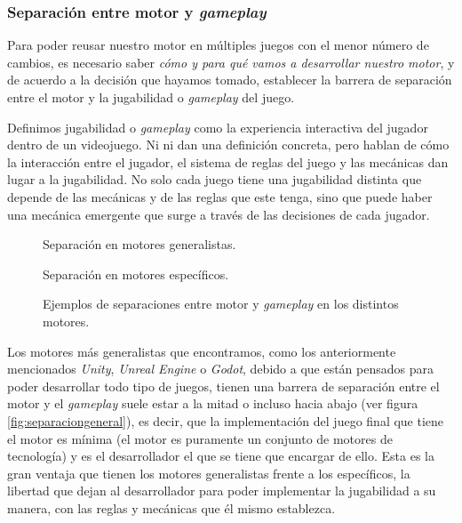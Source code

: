 \subsubsection{Separación entre motor y \textit{gameplay}}
Para poder reusar nuestro motor en múltiples juegos con el menor número de cambios, es necesario saber \textit{cómo y para qué vamos a desarrollar nuestro motor}, y de acuerdo a la decisión que hayamos tomado, establecer la barrera de separación entre el motor y la jugabilidad o \textit{gameplay} del juego.

\medskip

Definimos jugabilidad o \textit{gameplay} como la experiencia interactiva del jugador dentro de un videojuego. Ni \cite{tekinbas2003rules} ni \cite{schell2019art} dan una definición concreta, pero hablan de cómo la interacción entre el jugador, el sistema de reglas del juego y las mecánicas dan lugar a la jugabilidad. No solo cada juego tiene una jugabilidad distinta que depende de las mecánicas y de las reglas que este tenga, sino que puede haber una mecánica emergente que surge a través de las decisiones de cada jugador.

\smallskip

\begin{figure}[t]
\centering
\begin{SubFloat}
	{\label{fig:separaciongeneral}%
		Separación en motores generalistas.}%
\end{SubFloat}
\qquad
\begin{SubFloat}
	{\label{fig:separacionespecificos}%
		Separación en motores específicos.}%
\end{SubFloat}
\caption{Ejemplos de separaciones entre motor y \textit{gameplay} en los distintos motores. \label{fig:separacionesmotgp}}
\end{figure}

Los motores más generalistas que encontramos, como los anteriormente mencionados \textit{Unity}, \textit{Unreal Engine} o \textit{Godot}, debido a que están pensados para poder desarrollar todo tipo de juegos, tienen una barrera de separación entre el motor y el \textit{gameplay} suele estar a la mitad o incluso hacia abajo (ver figura \ref{fig:separaciongeneral}), es decir, que la implementación del juego final que tiene el motor es mínima (el motor es puramente un conjunto de motores de tecnología) y es el desarrollador el que se tiene que encargar de ello. Esta es la gran ventaja que tienen los motores generalistas frente a los específicos, la libertad que dejan al desarrollador para poder implementar la jugabilidad a su manera, con las reglas y mecánicas que él mismo establezca.


